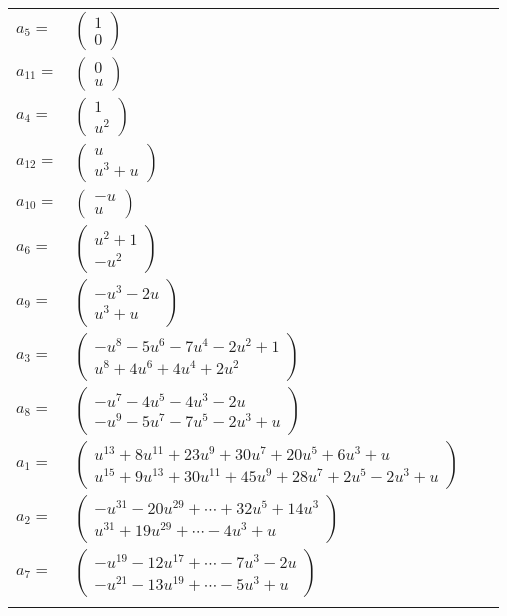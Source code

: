\documentclass[1p]{elsarticle_modified}
\theoremstyle{definition}
\begin{document}
\begin{tabular}{m{7pt} m{180pt} m{7pt} m{180pt} }
\flushright $a_{5}=$&$\begin{pmatrix}1\\0\end{pmatrix}$ \\
\flushright $a_{11}=$&$\begin{pmatrix}0\\u\end{pmatrix}$ \\
\flushright $a_{4}=$&$\begin{pmatrix}1\\u^2\end{pmatrix}$ \\
\flushright $a_{12}=$&$\begin{pmatrix}u\\u^3+u\end{pmatrix}$ \\
\flushright $a_{10}=$&$\begin{pmatrix}- u\\u\end{pmatrix}$ \\
\flushright $a_{6}=$&$\begin{pmatrix}u^2+1\\- u^2\end{pmatrix}$ \\
\flushright $a_{9}=$&$\begin{pmatrix}- u^3-2 u\\u^3+u\end{pmatrix}$ \\
\flushright $a_{3}=$&$\begin{pmatrix}- u^8-5 u^6-7 u^4-2 u^2+1\\u^8+4 u^6+4 u^4+2 u^2\end{pmatrix}$ \\
\flushright $a_{8}=$&$\begin{pmatrix}- u^7-4 u^5-4 u^3-2 u\\- u^9-5 u^7-7 u^5-2 u^3+u\end{pmatrix}$ \\
\flushright $a_{1}=$&$\begin{pmatrix}u^{13}+8 u^{11}+23 u^9+30 u^7+20 u^5+6 u^3+u\\u^{15}+9 u^{13}+30 u^{11}+45 u^9+28 u^7+2 u^5-2 u^3+u\end{pmatrix}$ \\
\flushright $a_{2}=$&$\begin{pmatrix}- u^{31}-20 u^{29}+\cdots+32 u^5+14 u^3\\u^{31}+19 u^{29}+\cdots-4 u^3+u\end{pmatrix}$ \\
\flushright $a_{7}=$&$\begin{pmatrix}- u^{19}-12 u^{17}+\cdots-7 u^3-2 u\\- u^{21}-13 u^{19}+\cdots-5 u^3+u\end{pmatrix}$\\&\end{tabular}
\end{document}
